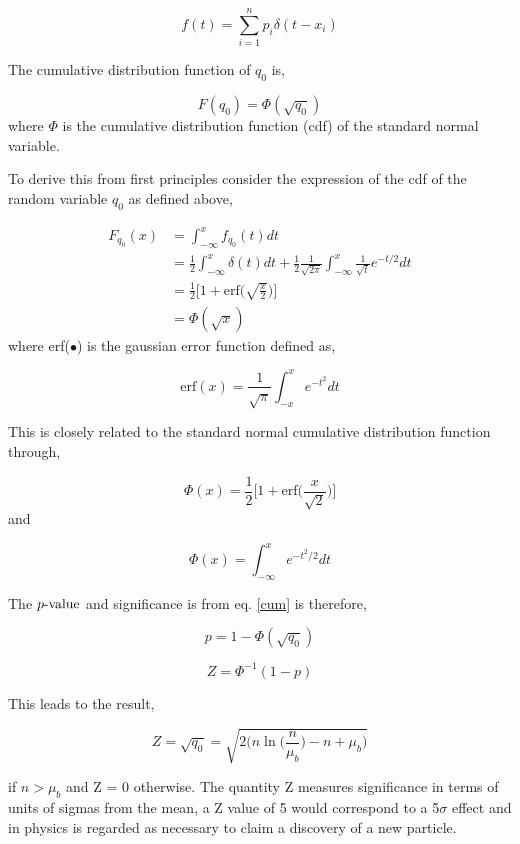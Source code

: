 \documentclass[a4paper,twoside]{report}
\newcommand{\pvalue}{\mathop{p{\textnormal{-value}}}}
\begin{document}
\begin{equation}
f(t) = \sum_{i=1}^{n}p_{i}\delta(t-x_{i})
\end{equation}

The cumulative distribution function of $q_{0}$ is,

\begin{equation}
F(q_{0}) = \Phi(\sqrt{q_{0}})
\label{cum}
\end{equation}
where $\Phi$ is the cumulative distribution function (cdf) of the standard normal variable. 

To derive this from first principles consider the expression of the cdf of the random variable $q_{0}$ as defined above,

\begin{equation*}
\begin{aligned}
F_{q_{0}}(x) &= \int_{-\infty}^{x}f_{q_{0}}(t)dt\\
& = \frac{1}{2}\int_{-\infty}^{x} \delta(t)dt + \frac{1}{2}\frac{1}{\sqrt{2\pi}}\int_{-\infty}^{x}\frac{1}{\sqrt{t}}e^{-t/2}dt\\
&= \frac{1}{2}\bigg[1 + \textrm{erf}\bigg(\sqrt{\frac{x}{2}}\bigg) \bigg] \\
&= \Phi(\sqrt{x})
\end{aligned}
\end{equation*}
where erf($\bullet$) is the gaussian error function defined as,

\begin{equation*}
\textrm{erf}(x) = \frac{1}{\sqrt{\pi}}\int_{-x}^{x}e^{-t^{2}} dt
\end{equation*}

This is closely related to the standard normal cumulative distribution function through, 

\begin{equation*}
\Phi(x) = \frac{1}{2}\bigg[1 + \textrm{erf}\bigg(\frac{x}{\sqrt{2}}\bigg)\bigg]
\end{equation*} 
and

\begin{equation*}
\Phi(x) = \int_{-\infty}^{x}e^{-t^{2}/2}dt
\end{equation*}

The $\pvalue$ and significance is from eq. \ref{cum} is therefore,

\begin{equation*}
p = 1 - \Phi(\sqrt{q_{0}}) 
\end{equation*}

\begin{equation*}
Z = \Phi^{-1}(1-p)
\end{equation*}

This leads to the result,

\begin{equation}
Z = \sqrt{q_{0}} = \sqrt{2\Bigg( n\ln\bigg(\frac{n}{\mu_{b}}\bigg) - n + \mu_{b}\Bigg)} 
\end{equation}

if $n > \mu_b$ and Z = 0 otherwise. The quantity Z measures significance in terms of units of sigmas from the mean, a Z value of 5 would correspond to a 5$\sigma$ effect and in physics is regarded as necessary to claim a discovery of a new particle.
\end{document}
